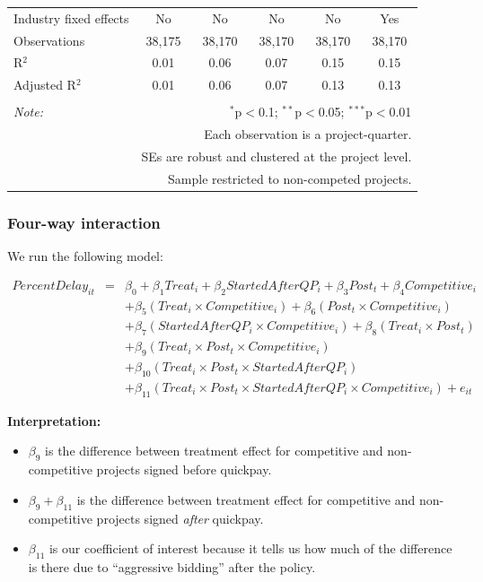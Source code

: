 \documentclass[
]{article}
\providecommand{\tightlist}{%
  \setlength{\itemsep}{0pt}\setlength{\parskip}{0pt}}
\begin{document}
\begin{table}[H]
\begin{tabular}{@{\extracolsep{-2pt}}lccccc}
Industry fixed effects & No & No & No & No & Yes \\ 
Observations & 38,175 & 38,170 & 38,170 & 38,170 & 38,170 \\ 
R$^{2}$ & 0.01 & 0.06 & 0.07 & 0.15 & 0.15 \\ 
Adjusted R$^{2}$ & 0.01 & 0.06 & 0.07 & 0.13 & 0.13 \\ 
\hline 
\hline \\[-1.8ex] 
\textit{Note:}  & \multicolumn{5}{r}{$^{*}$p$<$0.1; $^{**}$p$<$0.05; $^{***}$p$<$0.01} \\ 
 & \multicolumn{5}{r}{Each observation is a project-quarter.} \\ 
 & \multicolumn{5}{r}{SEs are robust and clustered at the project level.} \\ 
 & \multicolumn{5}{r}{Sample restricted to non-competed projects.} \\ 
\end{tabular} 
\end{table}

\hypertarget{four-way-interaction}{%
\subsubsection{Four-way interaction}\label{four-way-interaction}}

We run the following model:

\[\begin{aligned} PercentDelay_{it} &=& \beta_0 +\beta_1 Treat_i+ \beta_2 StartedAfterQP_i+ \beta_3 Post_t+ \beta_4 Competitive_i\\ && +  \beta_5 (Treat_i \times Competitive_i) + \beta_6 (Post_t \times Competitive_i)\\ && +  \beta_7 (StartedAfterQP_i \times Competitive_i) +\beta_8 (Treat_i \times Post_t)\\ && + \beta_9 (Treat_i \times Post_t \times Competitive_i) \\ && + \beta_{10} (Treat_i \times Post_t \times StartedAfterQP_i )\\ && + \beta_{11} (Treat_i \times Post_t \times StartedAfterQP_i \times Competitive_i) + e_{it} \end{aligned}\]

\textbf{Interpretation:}

\begin{itemize}
\tightlist
\item
  \(\beta_9\) is the difference between treatment effect for competitive
  and non-competitive projects signed before quickpay.
\item
  \(\beta_9 + \beta_{11}\) is the difference between treatment effect
  for competitive and non-competitive projects signed \emph{after}
  quickpay.
\item
  \(\beta_{11}\) is our coefficient of interest because it tells us how
  much of the difference is there due to ``aggressive bidding'' after
  the policy.
\end{itemize}
\end{document}
